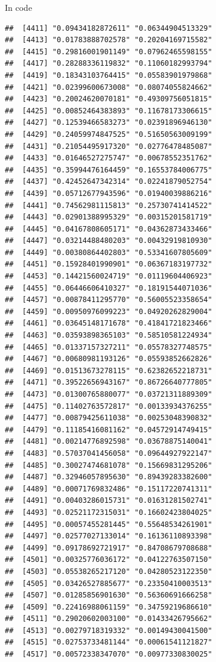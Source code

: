 \documentclass[ignorenonframetext,]{beamer}
\begin{document}
\begin{frame}[fragile]{In code}
\begin{verbatim}
##  [4411] "0.09434182872611" "0.06344904513329"
##  [4413] "0.01783888702578" "0.20204169715582"
##  [4415] "0.29816001901149" "0.07962465598155"
##  [4417] "0.28288336119832" "0.11060182993794"
##  [4419] "0.18343103764415" "0.05583901979868"
##  [4421] "0.02399600673008" "0.08074055824662"
##  [4423] "0.20024620070181" "0.49309756051815"
##  [4425] "0.00852464383893" "0.11678173306615"
##  [4427] "0.12539466583273" "0.02391896946130"
##  [4429] "0.24059974847525" "0.51650563009199"
##  [4431] "0.21054495917320" "0.02776478485087"
##  [4433] "0.01646527275747" "0.00678552351762"
##  [4435] "0.35994476164459" "0.16553784006775"
##  [4437] "0.42452647342314" "0.02241879052754"
##  [4439] "0.05712677943596" "0.01940039886216"
##  [4441] "0.74562981115813" "0.25730741414522"
##  [4443] "0.02901388995329" "0.00315201581719"
##  [4445] "0.04167808605171" "0.04362873433466"
##  [4447] "0.03214488480203" "0.00432919810930"
##  [4449] "0.00380864402803" "0.53341607805609"
##  [4451] "0.15928401990901" "0.06367183197732"
##  [4453] "0.14421560024719" "0.01119604406923"
##  [4455] "0.06446606410327" "0.18191544071036"
##  [4457] "0.00878411295770" "0.56005523358654"
##  [4459] "0.00950976099223" "0.04920262829004"
##  [4461] "0.03645148171678" "0.41841721823466"
##  [4463] "0.03593898365103" "0.58510581224934"
##  [4465] "0.01337157327211" "0.05578327748575"
##  [4467] "0.00680981193126" "0.05593852662826"
##  [4469] "0.01513673278115" "0.62382652218731"
##  [4471] "0.39522656943167" "0.86726640777805"
##  [4473] "0.01300765880077" "0.03721311889309"
##  [4475] "0.11402763572817" "0.00133934376255"
##  [4477] "0.00879425611038" "0.00253048390832"
##  [4479] "0.11185416081162" "0.04572914749415"
##  [4481] "0.00214776892598" "0.03678875140041"
##  [4483] "0.57037041456058" "0.09644927922147"
##  [4485] "0.30027474681078" "0.15669831295206"
##  [4487] "0.32946057895630" "0.89439283382600"
##  [4489] "0.00071769832486" "0.15117220741311"
##  [4491] "0.00403286015731" "0.01631281502741"
##  [4493] "0.02521172315031" "0.16602423804025"
##  [4495] "0.00057455281445" "0.55648534261901"
##  [4497] "0.02577027133014" "0.16136110893398"
##  [4499] "0.09178692721917" "0.84708679708688"
##  [4501] "0.00325776036172" "0.04122763507150"
##  [4503] "0.05538265217120" "0.04280523122350"
##  [4505] "0.03426527885677" "0.23350410003513"
##  [4507] "0.01285856901630" "0.56360691666258"
##  [4509] "0.22416988061159" "0.34759219686610"
##  [4511] "0.29020602003100" "0.01433426795662"
##  [4513] "0.00279718319332" "0.00149430041500"
##  [4515] "0.02753733481144" "0.00061541121827"
##  [4517] "0.00572338347070" "0.00977330830025"

\end{verbatim}
\end{frame}
\end{document}

